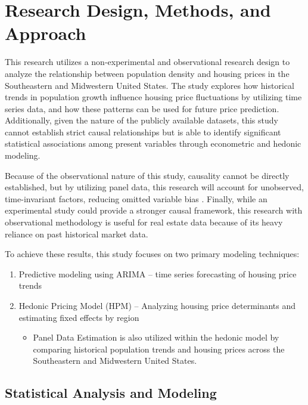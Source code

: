 \documentclass[journal,article,submit,pdftex,moreauthors]{Definitions/mdpi}
\begin{document}

\section{Research Design, Methods, and Approach}

This research utilizes a non-experimental and observational research design to analyze the relationship between population density and housing prices in the Southeastern and Midwestern United States. The study explores how historical trends in population growth influence housing price fluctuations by utilizing time series data, and how these patterns can be used for future price prediction. Additionally, given the nature of the publicly available datasets, this study cannot establish strict causal relationships but is able to identify significant statistical associations among present variables through econometric and hedonic modeling.

Because of the observational nature of this study, causality cannot be directly established, but by utilizing panel data, this research will account for unobserved, time-invariant factors, reducing omitted variable bias \citep{torresreyna_2010_getting}. Finally, while an experimental study could provide a stronger causal framework, this research with observational methodology is useful for real estate data because of its heavy reliance on past historical market data.

To achieve these results, this study focuses on two primary modeling techniques:
\begin{enumerate}
    \item Predictive modeling using ARIMA – time series forecasting of housing price trends
    \item Hedonic Pricing Model (HPM) – Analyzing housing price determinants and estimating fixed effects by region
    \begin{itemize}
        \item Panel Data Estimation is also utilized within the hedonic model by comparing historical population trends and housing prices across the Southeastern and Midwestern United States.
    \end{itemize}
\end{enumerate}

\subsection{Statistical Analysis and Modeling}
\end{document}
